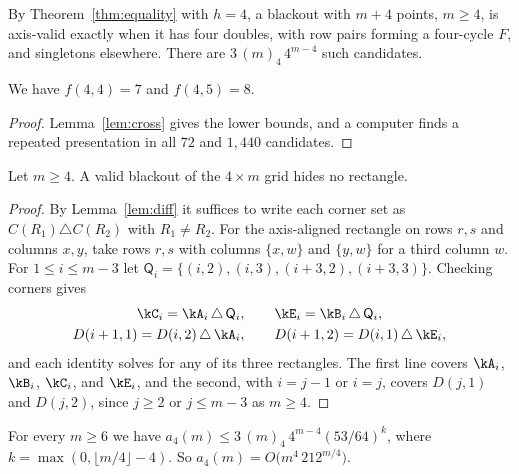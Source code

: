 By Theorem~\ref{thm:equality} with $h=4$, a blackout with $m+4$ points, $m\ge4$, is axis-valid exactly when it has four doubles, with row pairs forming a four-cycle $F$, and singletons elsewhere. There are $3\,(m)_4\,4^{m-4}$ such candidates.

\begin{corollary}\label{cor:fourboundary}
We have $f(4,4)=7$ and $f(4,5)=8$.
\end{corollary}

\begin{proof}
Lemma~\ref{lem:cross} gives the lower bounds, and a computer finds a repeated presentation in all $72$ and $1{,}440$ candidates.
\end{proof}

\begin{theorem}\label{thm:hidden}
Let $m\ge4$. A valid blackout of the $4\times m$ grid hides no rectangle.
\end{theorem}

\begin{proof}
By Lemma~\ref{lem:diff} it suffices to write each corner set as $C(R_1)\triangle C(R_2)$ with $R_1\ne R_2$. For the axis-aligned rectangle on rows $r,s$ and columns $x,y$, take rows $r,s$ with columns $\{x,w\}$ and $\{y,w\}$ for a third column $w$. For $1\le i\le m-3$ let $\mathsf Q_i=\{(i,2),(i,3),(i+3,2),(i+3,3)\}$. Checking corners gives
\begin{equation}\label{eq:fourxor}
\begin{gathered}
\kC_i=\kA_i\,\triangle\,\mathsf Q_i,\qquad \kE_i=\kB_i\,\triangle\,\mathsf Q_i,\\
D(i+1,1)=D(i,2)\,\triangle\,\kA_i,\qquad D(i+1,2)=D(i,1)\,\triangle\,\kE_i,
\end{gathered}
\end{equation}
and each identity solves for any of its three rectangles. The first line covers $\kA_i$, $\kB_i$, $\kC_i$, and $\kE_i$, and the second, with $i=j-1$ or $i=j$, covers $D(j,1)$ and $D(j,2)$, since $j\ge2$ or $j\le m-3$ as $m\ge4$.
\end{proof}

\begin{theorem}\label{thm:foursurvival}
For every $m\ge6$ we have $a_4(m)\le3\,(m)_4\,4^{m-4}(53/64)^k$, where
$k=\max(0,\lfloor m/4\rfloor-4)$. So $a_4(m)=O\bigl(m^4\,212^{m/4}\bigr)$.
\end{theorem}

